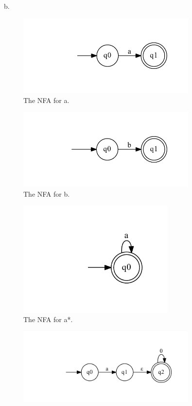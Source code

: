 \documentclass[10pt] {article}
\begin{document}
\begin{enumerate}
b.\begin{figure}[H]
\includegraphics[width=0.8\textwidth]{aa28.pdf}
\caption{The NFA for a.}
\label{37}
\end{figure}
\begin{figure}[H]
\includegraphics[width=0.8\textwidth]{ab28.pdf}
\caption{The NFA for b.}
\label{38}
\end{figure}
\begin{figure}[H]
\includegraphics[width=0.7\textwidth]{bc28.pdf}
\caption{The NFA for a*.}
\label{39}
\end{figure}
\begin{figure}[H]
\includegraphics[width=0.8\textwidth]{bd28.pdf}

\end{figure}
\end{enumerate}
\end{document}
